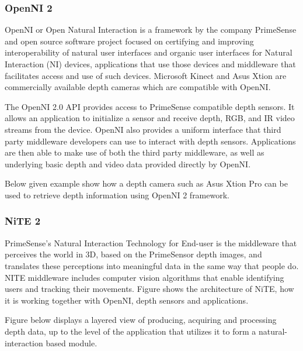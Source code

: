 \subsubsection{OpenNI 2}
OpenNI or Open Natural Interaction is a framework by the company PrimeSense and open source software project focused on certifying and improving interoperability of natural user interfaces and organic user interfaces for Natural Interaction (NI) devices, applications that use those devices and middleware that facilitates access and use of such devices. Microsoft Kinect and Asus Xtion are commercially available depth cameras which are compatible with OpenNI.

The OpenNI 2.0 API provides access to PrimeSense compatible depth sensors. It allows an application to initialize a sensor and receive depth, RGB, and IR video streams from the device. OpenNI also provides a uniform interface that third party middleware developers can use to interact with depth sensors. Applications are then able to make use of both the third party middleware, as well as underlying basic depth and video data provided directly by OpenNI.

Below given example show how a depth camera such as Asus Xtion Pro can be used to retrieve depth information using OpenNI 2 framework.

\subsubsection{NiTE 2}
PrimeSense's Natural Interaction Technology for End-user is the middleware that perceives the world in 3D, based on the PrimeSensor depth images, and translates these perceptions into meaningful data in the same way that people do. NITE middleware includes computer vision algorithms that enable identifying users and tracking their movements. Figure shows the architecture of NiTE, how it is working together with OpenNI, depth sensors and applications.

Figure  below displays a layered view of producing, acquiring and processing depth data, up to the level of the application that utilizes it to form a natural- interaction based module. 


